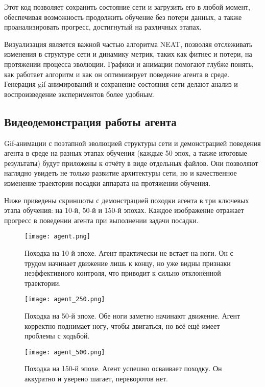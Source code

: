 \documentclass[a4paper,12pt]{article}
\begin{document}
Этот код позволяет сохранить состояние сети и загрузить его в любой момент, обеспечивая возможность продолжить обучение без потери данных, а также проанализировать прогресс, достигнутый на различных этапах.

Визуализация является важной частью алгоритма NEAT, позволяя отслеживать изменения в структуре сети и динамику метрик, таких как фитнес и потери, на протяжении процесса эволюции. Графики и анимации помогают глубже понять, как работает алгоритм и как он оптимизирует поведение агента в среде. Генерация gif-анимирований и сохранение состояния сети делают анализ и воспроизведение экспериментов более удобным.

\subsection{Видеодемонстрация работы агента}

Gif-анимации с поэтапной эволюцией структуры сети и демонстрацией поведения агента в среде на разных этапах обучения (каждые 50 эпох, а также итоговые результаты) будут приложены к отчёту в виде отдельных файлов. Они позволяют наглядно увидеть не только развитие архитектуры сети, но и качественное изменение траектории посадки аппарата на протяжении обучения.

Ниже приведены скриншоты с демонстрацией походки агента в три ключевых этапа обучения: на 10-й, 50-й и 150-й эпохах. Каждое изображение отражает прогресс в поведении агента при выполнении задачи посадки.

\begin{figure}[H]
	\centering
	\texttt{[image: agent.png]}
	\caption{Походка на 10-й эпохе. Агент практически не встает на ноги. Он с трудом начинает движение лишь к концу, но уже видны признаки неэффективного контроля, что приводит к сильно отклонённой траектории.}
	\label{fig:landing_epoch10}
\end{figure}

\begin{figure}[H]
	\centering
	\texttt{[image: agent\_250.png]}
	\caption{Походка на 50-й эпохе. Обе ноги заметно начинают движение. Агент корректно поднимает ногу, чтобы двигаться, но всё ещё имеет проблемы с ходьбой.}
	\label{fig:landing_epoch50}
\end{figure}

\begin{figure}[H]
	\centering
	\texttt{[image: agent\_500.png]}
	\caption{Походка на 150-й эпохе. Агент успешно осваивает походку. Он аккуратно и уверено шагает, переворотов нет.}
	\label{fig:landing_epoch150}
\end{figure}
\end{document}
